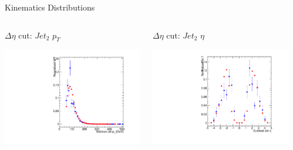 \documentclass[8pt]{beamer}
\begin{document}
\begin{frame}{Kinematics Distributions}
\begin{columns}
\begin{block}{$\Delta\eta$ cut: $Jet_2$ $p_T$}

\centering 
\includegraphics[width=\linewidth]{img/DEta_jpt_2.pdf} 
 
\end{block}

\begin{block}{$\Delta\eta$ cut: $Jet_2$ $\eta$}

\centering
\includegraphics[width=\linewidth]{img/DEta_jeta_2.pdf} 
 
\end{block}

\begin{block}
 

\end{block}
\end{columns}
\end{frame}
\end{document}
